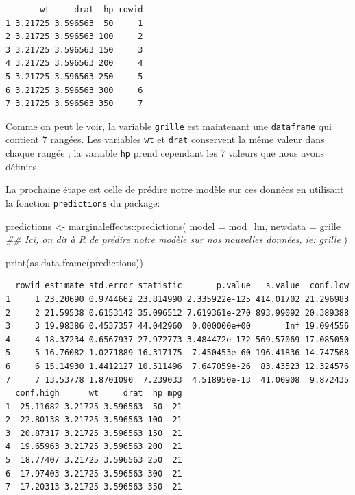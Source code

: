 \documentclass[
  letterpaper,
  DIV=11,
  numbers=noendperiod]{scrreprt}
\newenvironment{Shaded}{\begin{snugshade}}{\end{snugshade}}
\newcommand{\AttributeTok}[1]{\textcolor[rgb]{0.40,0.45,0.13}{#1}}
\newcommand{\DocumentationTok}[1]{\textcolor[rgb]{0.37,0.37,0.37}{\textit{#1}}}
\newcommand{\FunctionTok}[1]{\textcolor[rgb]{0.28,0.35,0.67}{#1}}
\newcommand{\NormalTok}[1]{\textcolor[rgb]{0.00,0.23,0.31}{#1}}
\newcommand{\OtherTok}[1]{\textcolor[rgb]{0.00,0.23,0.31}{#1}}
\newcommand{\SpecialCharTok}[1]{\textcolor[rgb]{0.37,0.37,0.37}{#1}}
\begin{document}
\begin{verbatim}
       wt     drat  hp rowid
1 3.21725 3.596563  50     1
2 3.21725 3.596563 100     2
3 3.21725 3.596563 150     3
4 3.21725 3.596563 200     4
5 3.21725 3.596563 250     5
6 3.21725 3.596563 300     6
7 3.21725 3.596563 350     7
\end{verbatim}

Comme on peut le voir, la variable \texttt{grille} est maintenant une
\texttt{dataframe} qui contient 7 rangées. Les variables \texttt{wt} et
\texttt{drat} conservent la même valeur dans chaque rangée ; la variable
\texttt{hp} prend cependant les 7 valeurs que nous avons définies.

La prochaine étape est celle de prédire notre modèle sur ces données en
utilisant la fonction \texttt{predictions} du package:

\begin{Shaded}
\begin{Highlighting}[]
\NormalTok{predictions }\OtherTok{\textless{}{-}}\NormalTok{ marginaleffects}\SpecialCharTok{::}\FunctionTok{predictions}\NormalTok{(}
      \AttributeTok{model =}\NormalTok{ mod\_lm,}
      \AttributeTok{newdata =}\NormalTok{ grille }\DocumentationTok{\#\# Ici, on dit à R de prédire notre modèle sur nos nouvelles données, ie: grille}
\NormalTok{)}

\FunctionTok{print}\NormalTok{(}\FunctionTok{as.data.frame}\NormalTok{(predictions))}
\end{Highlighting}
\end{Shaded}

\begin{verbatim}
  rowid estimate std.error statistic       p.value   s.value  conf.low
1     1 23.20690 0.9744662 23.814990 2.335922e-125 414.01702 21.296983
2     2 21.59538 0.6153142 35.096512 7.619361e-270 893.99092 20.389388
3     3 19.98386 0.4537357 44.042960  0.000000e+00       Inf 19.094556
4     4 18.37234 0.6567937 27.972773 3.484472e-172 569.57069 17.085050
5     5 16.76082 1.0271889 16.317175  7.450453e-60 196.41836 14.747568
6     6 15.14930 1.4412127 10.511496  7.647059e-26  83.43523 12.324576
7     7 13.53778 1.8701090  7.239033  4.518950e-13  41.00908  9.872435
  conf.high      wt     drat  hp mpg
1  25.11682 3.21725 3.596563  50  21
2  22.80138 3.21725 3.596563 100  21
3  20.87317 3.21725 3.596563 150  21
4  19.65963 3.21725 3.596563 200  21
5  18.77407 3.21725 3.596563 250  21
6  17.97403 3.21725 3.596563 300  21
7  17.20313 3.21725 3.596563 350  21
\end{verbatim}
\end{document}
